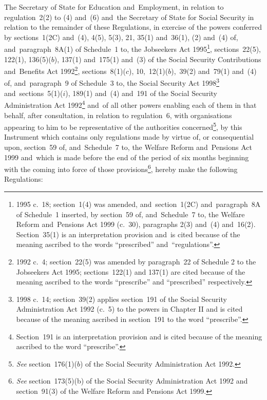\documentclass[12pt,a4paper]{article}
\title{\regstitle}
\author{S.I.\ 2001 No.\ 518}
\date{Made
22nd February 2001\\
Laid before Parliament
26th February 2001\\
Coming into~force
19th March 2001
}
\begin{document}
\maketitle

\noindent
The Secretary of State for Education and~Employment, in relation to regulation~2(2) to (4) and~(6) and~the Secretary of State for Social Security in relation to the remainder of these Regulations, in exercise of the powers conferred by sections~1(2C) and~(4), 4(5), 5(3), 21, 35(1) and~36(1), (2) and~(4) of, and~paragraph~8A(1) of Schedule~1 to, the Jobseekers Act 1995\footnote{1995 c.~18; section~1(4) was amended, and~section~1(2C) and~paragraph~8A of Schedule~1 inserted, by section~59 of, and~Schedule~7 to, the Welfare Reform and~Pensions Act 1999 (c.~30), paragraphs 2(3) and~(4) and~16(2). Section~35(1) is an interpretation provision and~is cited because of the meaning ascribed to the words “prescribed” and~“regulations”.}, sections~22(5), 122(1), 136(5)($b$), 137(1) and~175(1) and~(3) of the Social Security Contributions and~Benefits Act 1992\footnote{1992 c.~4; section~22(5) was amended by paragraph~22 of Schedule 2 to the Jobseekers Act 1995; sections~122(1) and 137(1) are cited because of the meaning ascribed to the words “prescribe” and “prescribed” respectively.}, sections~8(1)($c$), 10,~12(1)($b$),~39(2) and~79(1) and~(4) of, and~paragraph~9 of Schedule~3 to, the Social Security Act 1998\footnote{1998 c.~14; section~39(2) applies section~191 of the Social Security Administration Act 1992 (c.~5) to the powers in Chapter II and is cited because of the meaning ascribed in section~191 to the word “prescribe”.} and~sections~5(1)($i$), 189(1) and~(4) and~191 of the Social Security Administration Act 1992\footnote{Section~191 is an interpretation provision and is cited because of the meaning ascribed to the word “prescribe”.} and~of all other powers enabling each of them in that behalf, after consultation, in relation to regulation~6, with organisations appearing to him to be representative of the authorities concerned\footnote{\emph{See} section~176(1)($b$) of the Social Security Administration Act 1992.}, by this Instrument which contains only regulations made by virtue of, or consequential upon, section~59 of, and~Schedule~7 to, the Welfare Reform and~Pensions Act 1999 and~which is made before the end of the period of six months beginning with the coming into force of those provisions\footnote{\emph{See} section~173(5)(b) of the Social Security Administration Act 1992 and section~91(3) of the Welfare Reform and Pensions Act 1999.}, hereby make the following Regulations: 
\end{document}
